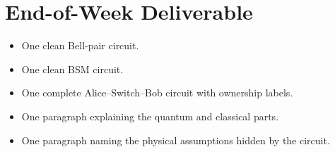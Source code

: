 \documentclass[11pt]{article}
\newcommand{\unchecked}{\(\square\)}
\begin{document}
\section{End-of-Week Deliverable}

\begin{itemize}[leftmargin=*]
    \item[\unchecked] One clean Bell-pair circuit.
    \item[\unchecked] One clean BSM circuit.
    \item[\unchecked] One complete Alice--Switch--Bob circuit with ownership labels.
    \item[\unchecked] One paragraph explaining the quantum and classical parts.
    \item[\unchecked] One paragraph naming the physical assumptions hidden by the circuit.
\end{itemize}
\end{document}
